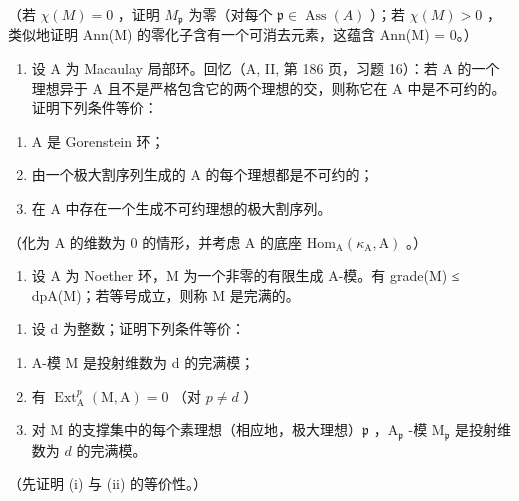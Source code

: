 （若 \(\chi(M) = 0\) ，证明 \(M_{\mathfrak{p}}\) 为零（对每个 \(\mathfrak{p} \in \operatorname{Ass}(A)\) ）；若 \(\chi(M) > 0\) ，类似地证明 Ann(M) 的零化子含有一个可消去元素，这蕴含 Ann(M) = 0。）

\begin{enumerate}
\def\labelenumi{\arabic{enumi})}
\setcounter{enumi}{2}
\tightlist
\item
  设 A 为 Macaulay 局部环。回忆（A, II, 第 186 页，习题 16）：若 A 的一个理想异于 A 且不是严格包含它的两个理想的交，则称它在 A 中是不可约的。证明下列条件等价：
\end{enumerate}

\begin{enumerate}
\def\labelenumi{(\roman{enumi})}
\item
  A 是 Gorenstein 环；
\item
  由一个极大割序列生成的 A 的每个理想都是不可约的；
\item
  在 A 中存在一个生成不可约理想的极大割序列。
\end{enumerate}

（化为 A 的维数为 0 的情形，并考虑 A 的底座 \(\mathrm{Hom}_{\mathrm{A}}(\kappa_{\mathrm{A}},\mathrm{A})\) 。）

\begin{enumerate}
\def\labelenumi{\arabic{enumi})}
\setcounter{enumi}{3}
\tightlist
\item
  设 A 为 Noether 环，M 为一个非零的有限生成 A-模。有 grade(M) ≤ dpA(M)；若等号成立，则称 M 是完满的。
\end{enumerate}

\begin{enumerate}
\def\labelenumi{\alph{enumi})}
\tightlist
\item
  设 d 为整数；证明下列条件等价：
\end{enumerate}

\begin{enumerate}
\def\labelenumi{(\roman{enumi})}
\item
  A-模 M 是投射维数为 d 的完满模；
\item
  有 \(\operatorname{Ext}_{\mathrm{A}}^{p}(\mathrm{M},\mathrm{A}) = 0\) （对 \(p\neq d\) ）
\item
  对 M 的支撑集中的每个素理想（相应地，极大理想）\(\mathfrak{p}\) ，\(\mathrm{A}_{\mathfrak{p}}\) -模 \(\mathrm{M}_{\mathfrak{p}}\) 是投射维数为 \(d\) 的完满模。
\end{enumerate}

（先证明 (i) 与 (ii) 的等价性。）

